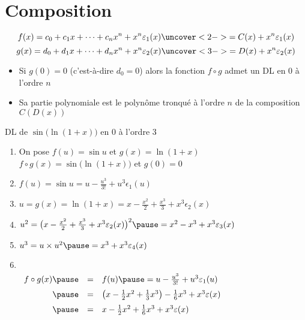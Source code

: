 \section{Composition}

\begin{frame}

$$f(x) =c_0+c_1x + \cdots +c_nx^n + x^n\epsilon_1(x) \uncover<2->{= C(x) + x^n\epsilon_1(x)}$$
$$g(x) =d_0+d_1x + \cdots +d_nx^n + x^n\epsilon_2(x) \uncover<3->{= D(x) + x^n\epsilon_2(x)}$$

\pause
\pause
\pause


\begin{proposition} 
\begin{itemize}
  \item Si $g(0)=0$ (c'est-à-dire $d_0=0$) alors la fonction $f\circ g$ admet un DL en $0$ à l'ordre $n$
\pause
  \item Sa partie polynomiale est le polynôme tronqué à l'ordre $n$ de la composition $C(D(x))$
\end{itemize}
\end{proposition}  

\end{frame}

\begin{frame}

\begin{exemple}
DL de $\sin\big(\ln(1+x)\big)$ en $0$ à l'ordre $3$
\pause
\begin{enumerate}
  \item On pose $f(u)=\sin u$ et $g(x)=\ln(1+x)$ \pause
$f\circ g(x) = \sin\big(\ln(1+x)\big)$ \pause et $g(0)=0$
\pause
  \item $f(u)=\sin u = u-\frac{u^3}{3!}+u^3\epsilon_1(u)$ 
\pause
  \item $u=g(x)=\ln(1+x)=x-\frac{x^2}{2}+\frac{x^3}{3}+x^3\epsilon_2(x)$
\pause
  \item $u^2 = \big(x-\frac{x^2}{2}+\frac{x^3}{3}+x^3\epsilon_2(x)\big)^2 \pause = x^2-x^3+x^3\epsilon_3(x)$
\pause
  \item $u^3 = u \times u^2 \pause = x^3+x^3\epsilon_4(x)$
\pause
  \item \ \\ \vspace*{-3ex}
$\begin{array}{rcl@{\vrule depth 1.2ex height 3ex width 0mm }}
f\circ g(x) \pause & = & f(u) \pause = u-\frac{u^3}{3!}+u^3\epsilon_1(u) \\
\pause
 & = & \big(x-\frac{1}{2}x^{2}+\frac{1}{3}x^3\big) -\frac16 x^3  +x^3\epsilon(x) \\
\pause
 & = & x-\frac{1}{2}x^{2}+\frac16 x^3  +x^3\epsilon(x) \\
\end{array}$
\end{enumerate}
\end{exemple}
\end{frame}


